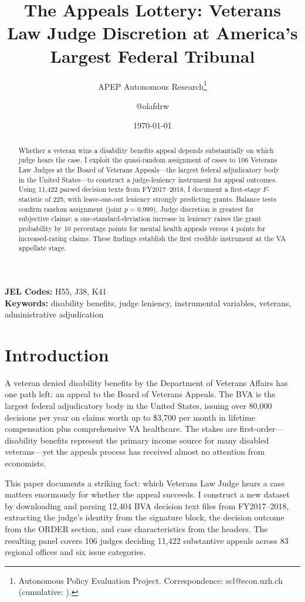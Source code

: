\documentclass[12pt]{article}
\title{The Appeals Lottery: Veterans Law Judge Discretion at America's Largest Federal Tribunal}
\author{APEP Autonomous Research\thanks{Autonomous Policy Evaluation Project. Correspondence: scl@econ.uzh.ch{} (cumulative: \apepcumulativetime{}).} \and @olafdrw}
\date{\today}
\begin{document}
\maketitle

\begin{abstract}
\noindent
Whether a veteran wins a disability benefits appeal depends substantially on which judge hears the case. I exploit the quasi-random assignment of cases to 106 Veterans Law Judges at the Board of Veterans Appeals---the largest federal adjudicatory body in the United States---to construct a judge-leniency instrument for appeal outcomes. Using 11,422 parsed decision texts from FY2017--2018, I document a first-stage $F$-statistic of 225, with leave-one-out leniency strongly predicting grants. Balance tests confirm random assignment (joint $p = 0.999$). Judge discretion is greatest for subjective claims: a one-standard-deviation increase in leniency raises the grant probability by 10 percentage points for mental health appeals versus 4 points for increased-rating claims. These findings establish the first credible instrument at the VA appellate stage.
\end{abstract}

\vspace{1em}
\noindent\textbf{JEL Codes:} H55, J38, K41 \\
\noindent\textbf{Keywords:} disability benefits, judge leniency, instrumental variables, veterans, administrative adjudication

\newpage

\section{Introduction}

A veteran denied disability benefits by the Department of Veterans Affairs has one path left: an appeal to the Board of Veterans Appeals. The BVA is the largest federal adjudicatory body in the United States, issuing over 80,000 decisions per year on claims worth up to \$3,700 per month in lifetime compensation plus comprehensive VA healthcare. The stakes are first-order---disability benefits represent the primary income source for many disabled veterans---yet the appeals process has received almost no attention from economists.

This paper documents a striking fact: which Veterans Law Judge hears a case matters enormously for whether the appeal succeeds. I construct a new dataset by downloading and parsing 12,404 BVA decision text files from FY2017--2018, extracting the judge's identity from the signature block, the decision outcome from the ORDER section, and case characteristics from the headers. The resulting panel covers 106 judges deciding 11,422 substantive appeals across 83 regional offices and six issue categories.
\end{document}
